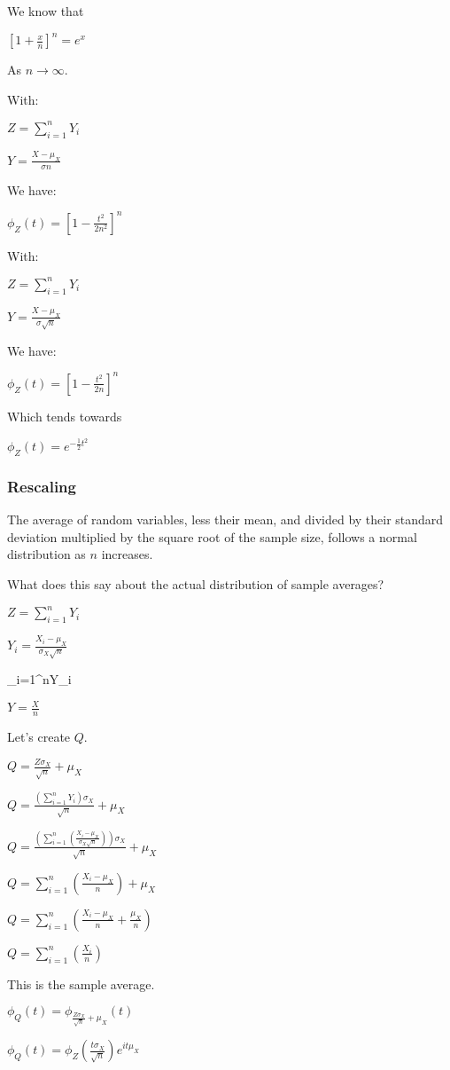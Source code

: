 {{We know that

$[1+\frac{x}{n}]^n=e^x$

As \(n \rightarrow \infty\).

With:

$Z=\sum_{i=1}^nY_i$

$Y=\frac{X-\mu_X }{\sigma n}$

We have:

$\phi_Z(t)=[1-\frac{t^2}{2n^2}]^n$

With:

$Z=\sum_{i=1}^nY_i$

$Y=\frac{X-\mu_X }{\sigma \sqrt n}$

We have:

$\phi_Z(t)=[1-\frac{t^2}{2n}]^n$

Which tends towards

$\phi_Z(t)=e^{-\frac{1}{2}t^2}$

\subsubsection{Rescaling}

The average of random variables, less their mean, and divided by their standard deviation multiplied by the square root of the sample size, follows a normal distribution as \(n\) increases.

What does this say about the actual distribution of sample averages?

$Z=\sum_{i=1}^nY_i$

$Y_i=\frac{X_i-\mu_X }{\sigma_X \sqrt n}$

\sum_{i=1}^nY_i

$Y=\frac{X}{n}$

Let's create \(Q\).

$Q=\frac{Z\sigma_X }{\sqrt n}+\mu_X$

$Q=\frac{(\sum_{i=1}^nY_i)\sigma_X }{\sqrt n}+\mu_X$

$Q=\frac{(\sum_{i=1}^n(\frac{X_i-\mu_X }{\sigma_X \sqrt n}))\sigma_X }{\sqrt n}+\mu_X$

$Q=\sum_{i=1}^n(\frac{X_i-\mu_X }{n})+\mu_X$

$Q=\sum_{i=1}^n(\frac{X_i-\mu_X }{n}+\frac{\mu_X}{n})$

$Q=\sum_{i=1}^n(\frac{X_i}{n})$

This is the sample average.

$\phi_Q(t)=\phi_{\frac{Z\sigma_X }{\sqrt n}+\mu_X}(t)$

$\phi_Q(t)=\phi_Z(\frac{t\sigma_X }{\sqrt n})e^{it\mu_X}$

}}
